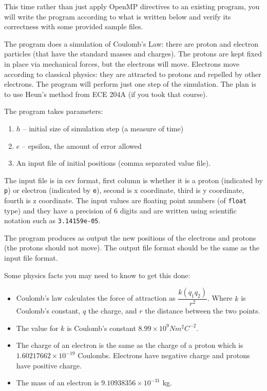 \documentclass[letterpaper,10pt]{article}
\begin{document}
This time rather than just apply OpenMP directives to an existing program, you will write the program according to what is written below and verify its correctness with some provided sample files.

The program does a simulation of Coulomb's Law: there are proton and electron particles (that have the standard masses and charges). The protons are kept fixed in place via mechanical forces, but the electrons will move. Electrons move according to classical physics: they are attracted to protons and repelled by other electrons. The program will perform just one step of the simulation. The plan is to use Heun's method from ECE 204A (if you took that course).

The program takes parameters:
\begin{enumerate}
\item $h$ -- initial size of simulation step (a measure of time) 
\item $e$ -- epsilon, the amount of error allowed
\item An input file of initial positions (comma separated value file).
\end{enumerate}

The input file is in csv format, first column is whether it is a proton (indicated by \texttt{p}) or electron (indicated by \texttt{e}), second is x coordinate, third is y coordinate, fourth is z coordinate. The input values are floating point numbers (of \texttt{float} type) and they have a precision of 6 digits and are written using scientific notation such as \texttt{3.14159e-05}. 

The program produces as output the new positions of the electrons and protons (the protons should not move). The output file format should be the same as the input file format.

Some physics facts you may need to know to get this done:

\begin{itemize}
\item Coulomb's law calculates the force of attraction as $\dfrac{k (q_{1} q_{2})}{r^{2}}$.  Where $k$ is Coulomb's constant, $q$ the charge, and $r$ the distance between the two points.

\item The value for $k$ is Coulomb's constant $8.99 \times 10^{9} N m^{2} C^{-2}$. 

\item The charge of an electron is the same as the charge of a proton which is $1.60217662 \times 10^{-19}$ Coulombs. Electrons have negative charge and protons have positive charge. 

\item The mass of an electron is $9.10938356 \times 10^{-31}$ kg.
\end{itemize}
\end{document}
